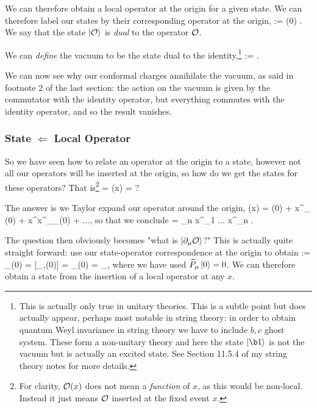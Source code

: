 We can therefore obtain a local operator at the origin for a given state. We can therefore label our states by their corresponding operator at the origin,
\bse 
    \ket{\cO} := \cO(0) .
\ese 
We say that the state $\ket{\mathcal{O}}$ is \textit{dual} to the operator $\mathcal{O}$.

\bd[Vacuum]
    We can \textit{define} the vacuum to be the state dual to the identity,\footnote{This is actually only true in unitary theories. This is a subtle point but does actually appear, perhaps most notable in string theory: in order to obtain quantum Weyl invariance in string theory we have to include $b,c$ ghost system. These form a non-unitary theory and here the state $\ket{\b1}$ is not the vacuum but is actually an excited state. See Section 11.5.4 of my string theory notes for more details.} 
    \be 
    \label{eqn:VacuumDualToIdentity}
         := .
    \ee
\ed 

\br 
    We can now see why our conformal charges annihilate the vacuum, as said in footnote 2 of the last section: the action on the vacuum is given by the commutator with the identity operator, but everything commutes with the identity operator, and so the result vanishes. 
\er 

\subsubsection{State $\Leftarrow$ Local Operator}

So we have seen how to relate an operator at the origin to a state, however not all our operators will be inserted at the origin, so how do we get the states for these operators? That is\footnote{For clarity, $\mathcal{O}(x)$ does not mean a \textit{function} of $x$, as this would be non-local. Instead it just means $\mathcal{O}$ inserted at the fixed event $x$.}
\bse 
    \ket{\psi} = \cO(x)  = ?
\ese

The answer is we Taylor expand our operator around the origin,
\bse 
    \cO(x) = \cO(0) + x^{\mu}\p_{\mu} \cO(0) + x^{\mu}x^{\nu}\p_{\mu}\p_{\nu}\cO(0) + ...,
\ese 
so that we conclude 
\bse 
    \ket{\psi} = \sum_n  x^{\mu_1} ... x^{\mu_n} .
\ese

The question then obviously becomes "what is $\ket{\partial_{\mu}\mathcal{O}}$?" This is actually quite straight forward: use our state-operator correspondence at the origin to obtain 
\bse 
    \ket{\p_{\mu}\cO} := \p_{\mu}\cO(0) = [_{\mu},\cO(0)] = _{\mu}\cO(0) = _{\mu}\ket{\cO},
\ese 
where we have used $\widetilde{P}_{\mu}\ket{0} = 0$. We can therefore obtain a state from the insertion of a local operator at any $x$.

